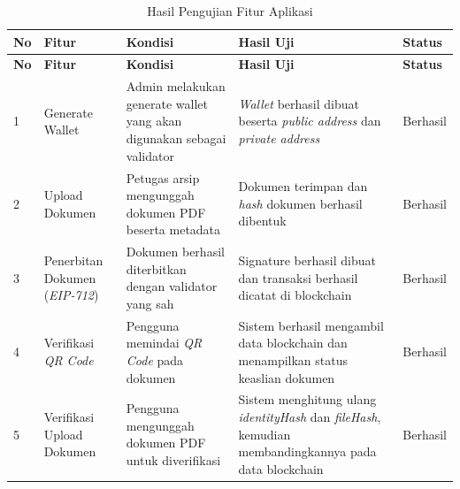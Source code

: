 			\renewcommand{\arraystretch}{1.3}
			\begin{longtable}{|
				>{\centering\arraybackslash}p{0.8cm}|
				>{\raggedright\arraybackslash}p{2.3cm}|
				p{3.8cm}|
				p{4.5cm}|
				>{\centering\arraybackslash}p{1.6cm}|}

				\caption{Hasil Pengujian Fitur Aplikasi}
				\label{tab:pengujian_fitur} \\

				\hline
				\textbf{No} &
				\textbf{Fitur} &
				\textbf{Kondisi} &
				\textbf{Hasil Uji} &
				\textbf{Status} \\ \hline
				\endfirsthead

				\hline
				\textbf{No} &
				\textbf{Fitur} &
				\textbf{Kondisi} &
				\textbf{Hasil Uji} &
				\textbf{Status} \\ \hline
				\endhead

				\hline
				\endfoot

				\hline
				\endlastfoot

				1 &
				Generate Wallet &
				Admin melakukan generate wallet yang akan digunakan sebagai validator &
				\textit{Wallet} berhasil dibuat beserta \textit{public address} dan \textit{private address} &
				Berhasil \\ \hline

				2 &
				Upload Dokumen &
				Petugas arsip mengunggah dokumen PDF beserta metadata &
				Dokumen terimpan dan \textit{hash} dokumen berhasil dibentuk &
				Berhasil \\ \hline

				3 &
				Penerbitan Dokumen (\textit{EIP-712}) &
				Dokumen berhasil diterbitkan dengan validator yang sah &
				Signature berhasil dibuat dan transaksi berhasil dicatat di blockchain &
				Berhasil \\ \hline

				4 &
				Verifikasi \textit{QR Code} &
				Pengguna memindai \textit{QR Code} pada dokumen &
				Sistem berhasil mengambil data blockchain dan menampilkan status keaslian dokumen &
				Berhasil \\ \hline

				5 &
				Verifikasi Upload Dokumen &
				Pengguna mengunggah dokumen PDF untuk diverifikasi &
				Sistem menghitung ulang \textit{identityHash} dan \textit{fileHash}, kemudian membandingkannya pada data blockchain &
				Berhasil \\ \hline

			\end{longtable}

